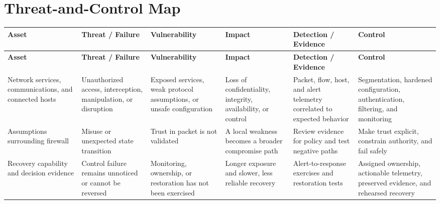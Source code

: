 \documentclass[11pt,letterpaper]{article}
\begin{document}
\section*{Threat-and-Control Map}
\begingroup\scriptsize\setlength{\tabcolsep}{2pt}
\begin{longtable}{>{\raggedright\arraybackslash}p{}>{\raggedright\arraybackslash}p{}>{\raggedright\arraybackslash}p{}>{\raggedright\arraybackslash}p{}>{\raggedright\arraybackslash}p{}>{\raggedright\arraybackslash}p{}}
\toprule\rowcolor{Navy}\color{white}\textbf{Asset} & \color{white}\textbf{Threat / Failure} & \color{white}\textbf{Vulnerability} & \color{white}\textbf{Impact} & \color{white}\textbf{Detection / Evidence} & \color{white}\textbf{Control}\\\midrule
\endfirsthead
\toprule\rowcolor{Navy}\color{white}\textbf{Asset} & \color{white}\textbf{Threat / Failure} & \color{white}\textbf{Vulnerability} & \color{white}\textbf{Impact} & \color{white}\textbf{Detection / Evidence} & \color{white}\textbf{Control}\\\midrule
\endhead
Network services, communications, and connected hosts & Unauthorized access, interception, manipulation, or disruption & Exposed services, weak protocol assumptions, or unsafe configuration & Loss of confidentiality, integrity, availability, or control & Packet, flow, host, and alert telemetry correlated to expected behavior & Segmentation, hardened configuration, authentication, filtering, and monitoring\\\midrule
Assumptions surrounding firewall & Misuse or unexpected state transition & Trust in packet is not validated & A local weakness becomes a broader compromise path & Review evidence for policy and test negative paths & Make trust explicit, constrain authority, and fail safely\\\midrule
Recovery capability and decision evidence & Control failure remains unnoticed or cannot be reversed & Monitoring, ownership, or restoration has not been exercised & Longer exposure and slower, less reliable recovery & Alert-to-response exercises and restoration tests & Assigned ownership, actionable telemetry, preserved evidence, and rehearsed recovery\\\midrule
\bottomrule
\end{longtable}
\endgroup
\end{document}
